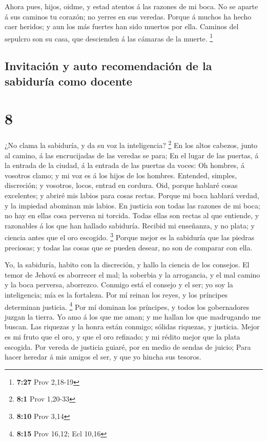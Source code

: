  Ahora pues, hijos, oidme, y estad atentos á las razones
de mi boca.  No se aparte á sus caminos tu corazón; no
yerres en sus veredas.  Porque á muchos ha hecho caer
heridos; y aun los más fuertes han sido muertos por ella.
 Caminos del sepulcro son su casa, que descienden á las
cámaras de la muerte. \footnote{\textbf{7:27} Prov 2,18-19}

\hypertarget{invitaciuxf3n-y-auto-recomendaciuxf3n-de-la-sabiduruxeda-como-docente}{%
\subsection{Invitación y auto recomendación de la sabiduría como
docente}\label{invitaciuxf3n-y-auto-recomendaciuxf3n-de-la-sabiduruxeda-como-docente}}

\hypertarget{section-7}{%
\section{8}\label{section-7}}

 ¿No clama la sabiduría, y da su voz la inteligencia?
\footnote{\textbf{8:1} Prov 1,20-33}  En los altos
cabezos, junto al camino, á las encrucijadas de las veredas se para;
 En el lugar de las puertas, á la entrada de la ciudad, á
la entrada de las puertas da voces:  Oh hombres, á
vosotros clamo; y mi voz es á los hijos de los hombres. 
Entended, simples, discreción; y vosotros, locos, entrad en cordura.
 Oid, porque hablaré cosas excelentes; y abriré mis labios
para cosas rectas.  Porque mi boca hablará verdad, y la
impiedad abominan mis labios.  En justicia son todas las
razones de mi boca; no hay en ellas cosa perversa ni torcida.
 Todas ellas son rectas al que entiende, y razonables á
los que han hallado sabiduría.  Recibid mi enseñanza, y
no plata; y ciencia antes que el oro escogido. \footnote{\textbf{8:10}
  Prov 3,14}  Porque mejor es la sabiduría que las
piedras preciosas; y todas las cosas que se pueden desear, no son de
comparar con ella.

 Yo, la sabiduría, habito con la discreción, y hallo la
ciencia de los consejos.  El temor de Jehová es aborrecer
el mal; la soberbia y la arrogancia, y el mal camino y la boca perversa,
aborrezco.  Conmigo está el consejo y el ser; yo soy la
inteligencia; mía es la fortaleza.  Por mí reinan los
reyes, y los príncipes determinan justicia. \footnote{\textbf{8:15} Prov
  16,12; Ecl 10,16}  Por mí dominan los príncipes, y
todos los gobernadores juzgan la tierra.  Yo amo á los
que me aman; y me hallan los que madrugando me buscan. 
Las riquezas y la honra están conmigo; sólidas riquezas, y justicia.
 Mejor es mi fruto que el oro, y que el oro refinado; y
mi rédito mejor que la plata escogida.  Por vereda de
justicia guiaré, por en medio de sendas de juicio;  Para
hacer heredar á mis amigos el ser, y que yo hincha sus tesoros.

